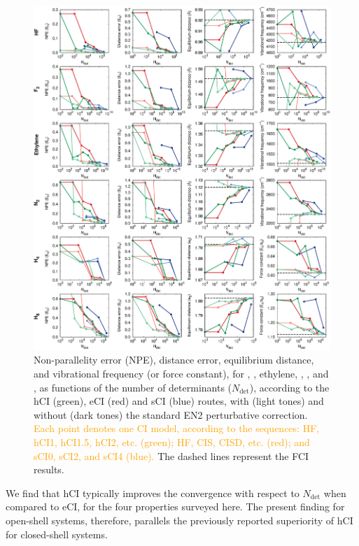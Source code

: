 \documentclass[aip,jcp,reprint,noshowkeys,superscriptaddress]{revtex4-1}
\newcommand{\fk}[1]{\textcolor{orange}{#1}}
\newcommand{\Ndet}{N_\text{det}}
\begin{document}
\begin{figure}%
\includegraphics[width=1.0\linewidth]{plot_all_closed}
\caption{
Non-parallelity error (NPE), distance error, equilibrium distance, and vibrational frequency (or force constant), for , , ethylene, , , and , as functions of the number of determinants ($\Ndet$), according to the hCI (green), eCI (red) and sCI (blue) routes,
with (light tones) and without (dark tones) the standard EN2 perturbative correction.
\fk{Each point denotes one CI model, according to the sequences: HF, hCI1, hCI1.5, hCI2, etc. (green); HF, CIS, CISD, etc. (red); and sCI0, sCI2, and sCI4 (blue).}
The dashed lines represent the FCI results.}
\label{fig:plot_all_closed}
\end{figure}

We find that hCI typically improves the convergence with respect to $\Ndet$ when compared to eCI, for the four properties surveyed here.
The present finding for open-shell systems, therefore, parallels the previously reported superiority of hCI for closed-shell systems. \cite{Kossoski_2022}
\end{document}
